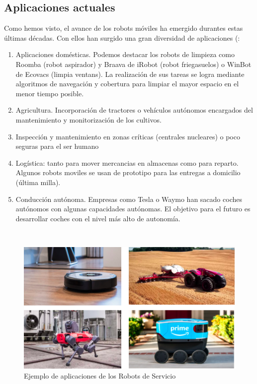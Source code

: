 \subsection{Aplicaciones actuales}
\label{subsec:aplicaciones_actuales}
Como hemos visto, el avance de los robots móviles ha emergido durantes estas últimas décadas. Con ellos han surgido una gran diversidad de aplicaciones (:

\begin{enumerate}
	\item Aplicaciones domésticas. Podemos destacar los robots de limpieza como Roomba (robot aspirador) y Braava de iRobot (robot friegasuelos) o WinBot de Ecovacs (limpia ventans). La realización de sus tareas se logra mediante algoritmos de navegación y cobertura para limpiar el mayor espacio en el menor tiempo posible.
	\item Agricultura. Incorporación de tractores o vehículos autónomos encargados del mantenimiento y monitorización de los cultivos.
	\item Inspección y mantenimiento en zonas críticas (centrales nucleares) o poco seguras para el ser humano
	\item Logística: tanto para mover mercancias en almacenas como para reparto. Algunos robots moviles se usan de prototipo para las entregas a domicilio (última milla).
	\item Conducción autónoma. Empresas como Tesla o Waymo han sacado coches autónomos con algunas capacidades autónomas. El objetivo para el futuro es desarrollar coches con el nivel más alto de autonomía.
\end{enumerate}\

\begin{figure}[H]
  \begin{center}
    \includegraphics[width=15cm]{imagenes/cap1/aplicaciones.png}
  \end{center}
  \caption[Ejemplos de aplicaciones de los Robots de Servicio]{Ejemplo de aplicaciones de los Robots de Servicio}
  \label{fig:neurona}
\end{figure}\



